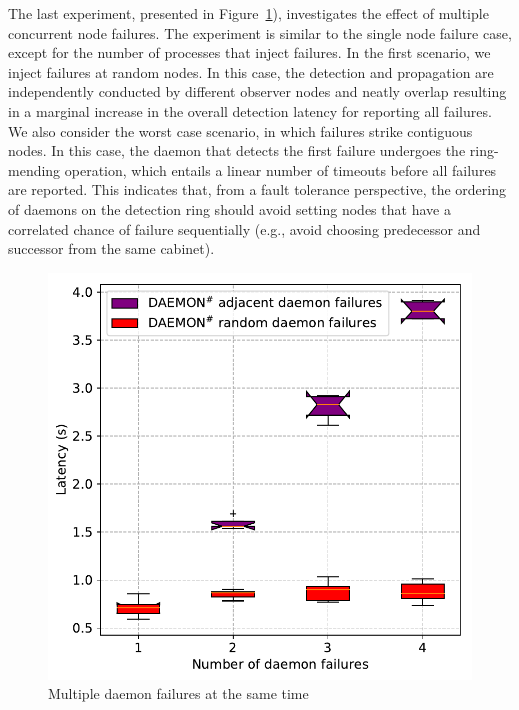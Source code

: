 \documentclass[sigconf]{acmart}
\begin{document}
The last experiment, presented in Figure~\ref{fig:multi_daemon_failure_nacl}), investigates the effect of multiple concurrent node failures. The experiment is similar to the single node failure case, except for the 
number of processes that inject failures. In the first scenario, we inject failures at random nodes. 
In this case, the detection and propagation are independently conducted by different observer nodes and neatly overlap resulting in a marginal increase in the overall detection latency for 
reporting all failures. We also consider the worst case scenario, in which failures strike 
contiguous nodes. In this case, the daemon that detects the first failure 
undergoes the ring-mending operation, which entails a linear number of timeouts
before all failures are reported. This indicates that, from a fault 
tolerance perspective, the ordering of 
daemons on the detection ring should avoid setting nodes that have a 
correlated chance of failure sequentially (e.g., avoid choosing predecessor and successor from the same cabinet).

\begin{figure}[h]
  \centering
  \includegraphics[width=\linewidth]{multi_daemon_failures.pdf}
  \caption{Multiple daemon failures at the same time}
  \label{fig:multi_daemon_failure_nacl}
\end{figure}
\end{document}
